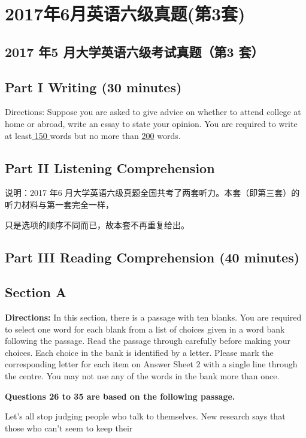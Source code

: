 \documentclass[UTF8,11pt]{ctexart}
\begin{document}
\section*{2017年6月英语六级真题(第3套)}
\subsection*{\textbf{2017 年5 月大学英语六级考试真题（第3 套）}}


\subsection*{Part I Writing (30 minutes)}


Directions: Suppose you are asked to give advice on whether to attend college at home or abroad, write an essay to state your opinion. You are required to write at least\uline{ 150 }words but no more than \uline{200} words.


\subsection*{Part II Listening Comprehension}


说明：2017 年6 月大学英语六级真题全国共考了两套听力。本套（即第三套）的听力材料与第一套完全一样，


只是选项的顺序不同而已，故本套不再重复给出。


\subsection*{\textbf{Part III Reading Comprehension (40 minutes)}}


\subsection*{\textbf{Section A}}


\textbf{Directions:} In this section, there is a passage with ten blanks. You are required to select one word for each blank from a list of choices given in a word bank following the passage. Read the passage through carefully before making your choices. Each choice in the bank is identified by a letter. Please mark the corresponding letter for each item on Answer Sheet 2 with a single line through the centre. You may not use any of the words in the bank more than once.


\textbf{Questions 26 to 35 are based on the following passage.}


Let's all stop judging people who talk to themselves. New research says that those who can't seem to keep their
\end{document}
